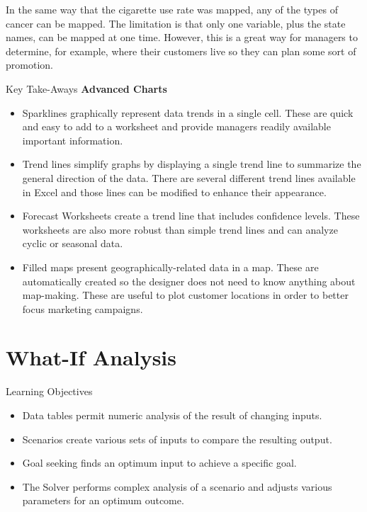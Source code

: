 In the same way that the cigarette use rate was mapped, any of the types of cancer can be mapped. The limitation is that only one variable, plus the state names, can be mapped at one time. However, this is a great way for managers to determine, for example, where their customers live so they can plan some sort of promotion.

\begin{center}
	\begin{tkwbox}{Key Take-Aways}
		\textbf{Advanced Charts}
		\\
		\begin{itemize}
			\setlength{\itemsep}{0pt}
			\setlength{\parskip}{0pt}
			\setlength{\parsep}{0pt}
			
			\item Sparklines graphically represent data trends in a single cell. These are quick and easy to add to a worksheet and provide managers readily available important information.
			\item Trend lines simplify graphs by displaying a single trend line to summarize the general direction of the data. There are several different trend lines available in Excel and those lines can be modified to enhance their appearance.
			\item Forecast Worksheets create a trend line that includes confidence levels. These worksheets are also more robust than simple trend lines and can analyze cyclic or seasonal data.
			\item Filled maps present geographically-related data in a map. These are automatically created so the designer does not need to know anything about map-making. These are useful to plot customer locations in order to better focus marketing campaigns.
			
		\end{itemize}
	\end{tkwbox}
\end{center}

\section{What-If Analysis}

\begin{center}
	\begin{objbox}{Learning Objectives}
		\begin{itemize}
			\setlength{\itemsep}{0pt}
			\setlength{\parskip}{0pt}
			\setlength{\parsep}{0pt}
			
			\item Data tables permit numeric analysis of the result of changing inputs.
			\item Scenarios create various sets of inputs to compare the resulting output.
			\item Goal seeking finds an optimum input to achieve a specific goal.
			\item The Solver performs complex analysis of a scenario and adjusts various parameters for an optimum outcome.
			
		\end{itemize}
	\end{objbox}
\end{center}

